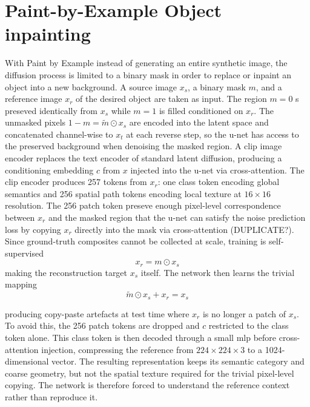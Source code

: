 \section{Paint-by-Example Object inpainting}
With Paint by Example \cite{pbe} instead of generating an entire synthetic image, the diffusion process is limited to a binary mask in order to replace 
or inpaint an object into a new background. A source image $x_s$, a binary mask $m$, and a reference image $x_r$ 
of the desired object are taken as input. The region $m=0$ s preseved identically from $x_s$ while $m=1$ is filled 
conditioned on $x_r$. The unmasked pixels $1 - m = \tilde{m} \odot x_s$ are encoded into the latent space and concatenated 
channel-wise to $x_t$ at each reverse step, so the 
\gls{u-net} has access to the preserved background when denoising the masked region. A \gls{clip} image encoder\cite{clip} replaces 
the text encoder of standard latent diffusion, producing a conditioning embedding $c$ from $x$ injected into the \gls{u-net} via cross-attention.
The \gls{clip} encoder produces 257 tokens from $x_r$: one class token encoding global semantics and 256 spatial path tokens encoding local texture 
at $16\times16$ resolution\cite{pbe}. The 256 patch token preseve enough pixel-level correspondence between $x_r$ and the masked region that the \gls{u-net} 
can satisfy the noise prediction loss by copying $x_r$ directly into the mask via cross-attention (DUPLICATE?). Since ground-truth composites cannot be 
collected at scale, training is self-supervised
\begin{equation}
    \label{eq:self-supervised reference copied into mask}
    x_r = m \odot x_s
\end{equation} 
 making the reconstruction target $x_s$ itself\cite{pbe}. The network then learns the trivial mapping 
 \begin{equation}
    \label{eq:trivial mapping}
    \tilde{m} \odot x_s + x_r = x_s
 \end{equation}
 
producing copy-paste artefacts at test time where $x_r$ is no longer a patch of $x_s$. 
To avoid this, the 256 patch tokens are dropped and $c$ restricted to the class token alone. This class token is then decoded through a small \gls{mlp} 
before cross-attention injection, compressing the reference from $224 \times 224 \times 3$ 
to a 1024-dimensional vector. The resulting representation keeps its semantic category and coarse geometry, 
but not the spatial texture required for the trivial pixel-level copying. The network is therefore forced to understand the reference context rather than reproduce it. 


